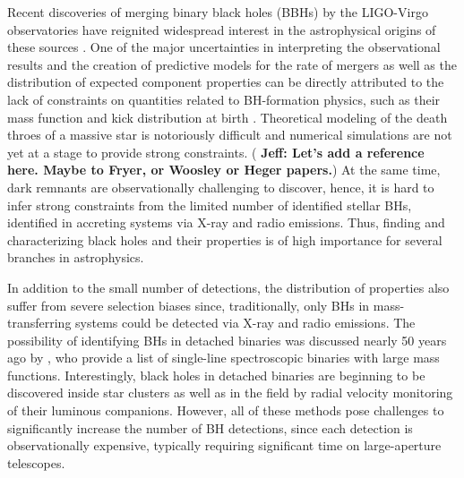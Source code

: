 \documentclass[twocolumn,tighten]{aastex61}
\newcommand{\jeff}[1]{\textbf{\color{teal} Jeff: #1}}
\begin{document}
Recent discoveries of merging binary black holes (BBHs) by the LIGO-Virgo observatories \citep[e.g.,][]{Abbott_GW150914,Abbott_O1,Abbott_GW151226,Abbott_GW170104,Abbott_GW170608,Abbott_GW170814} have reignited widespread interest in the astrophysical origins of these sources \citep[e.g.,][]{Abbott_astrophys}. One of the major uncertainties in interpreting the observational results and the creation of predictive models for the rate of mergers as well as the distribution of expected component properties can be directly attributed to the lack of constraints on quantities related to BH-formation physics, such as their mass function and kick distribution at birth \citep[e.g.,][]{Chatterjee2017_uncertainties}. Theoretical modeling of the death throes of a massive star is notoriously difficult and numerical simulations are not yet at a stage to provide strong constraints. 
(\jeff{Let's add a reference here. Maybe to Fryer, or Woosley or Heger papers.})
At the same time, dark remnants are observationally challenging to discover, hence, it is hard to infer strong constraints from the limited number of identified stellar BHs, identified in accreting systems via X-ray and radio emissions. %
Thus, finding and characterizing black holes and their properties is of high importance for several branches in astrophysics. 

In addition to the small number of detections, the distribution of properties also suffer from severe selection biases since, traditionally, only BHs in mass-transferring systems could be detected via X-ray and radio emissions. The possibility of identifying BHs in detached binaries was discussed nearly 50 years ago by \citet{trimble1969}, who provide a list of single-line spectroscopic binaries with large mass functions. Interestingly, black holes in detached binaries are beginning to be discovered inside star clusters \citep{2018MNRAS.475L..15G} as well as in the field \citep{Thompson2018} by radial velocity monitoring of their luminous companions. However, all of these methods pose challenges to significantly increase the number of BH detections, since each detection is observationally expensive, typically requiring significant time on large-aperture telescopes. 
\end{document}
